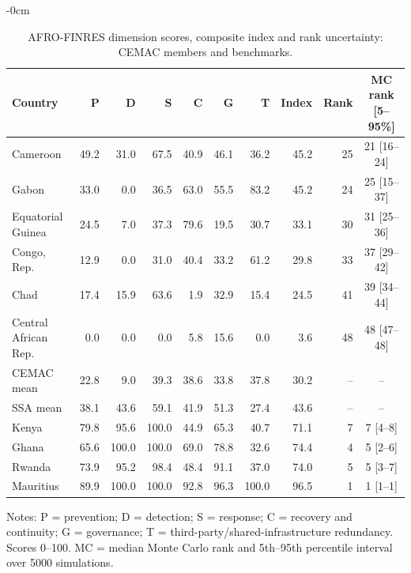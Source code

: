 \documentclass[fintech,article,submit,pdftex,moreauthors]{Definitions/mdpi}
\begin{document}
\begin{table}[H]
\begin{adjustwidth}{-\extralength}{0cm}
\centering
\caption{AFRO-FINRES dimension scores, composite index and rank uncertainty: CEMAC members and benchmarks.}
\label{tab:cemac}
\small
\begin{threeparttable}
\begin{tabular}{l rrrrrr r r c}
\toprule
Country & P & D & S & C & G & T & Index & Rank & MC rank [5--95\%] \\
\midrule
Cameroon & 49.2 & 31.0 & 67.5 & 40.9 & 46.1 & 36.2 & 45.2 & 25 & 21 [16--24] \\
Gabon & 33.0 & 0.0 & 36.5 & 63.0 & 55.5 & 83.2 & 45.2 & 24 & 25 [15--37] \\
Equatorial Guinea & 24.5 & 7.0 & 37.3 & 79.6 & 19.5 & 30.7 & 33.1 & 30 & 31 [25--36] \\
Congo, Rep. & 12.9 & 0.0 & 31.0 & 40.4 & 33.2 & 61.2 & 29.8 & 33 & 37 [29--42] \\
Chad & 17.4 & 15.9 & 63.6 & 1.9 & 32.9 & 15.4 & 24.5 & 41 & 39 [34--44] \\
Central African Rep. & 0.0 & 0.0 & 0.0 & 5.8 & 15.6 & 0.0 & 3.6 & 48 & 48 [47--48] \\
\midrule
CEMAC mean & 22.8 & 9.0 & 39.3 & 38.6 & 33.8 & 37.8 & 30.2 & -- & -- \\
SSA mean & 38.1 & 43.6 & 59.1 & 41.9 & 51.3 & 27.4 & 43.6 & -- & -- \\
\midrule
Kenya & 79.8 & 95.6 & 100.0 & 44.9 & 65.3 & 40.7 & 71.1 & 7 & 7 [4--8] \\
Ghana & 65.6 & 100.0 & 100.0 & 69.0 & 78.8 & 32.6 & 74.4 & 4 & 5 [2--6] \\
Rwanda & 73.9 & 95.2 & 98.4 & 48.4 & 91.1 & 37.0 & 74.0 & 5 & 5 [3--7] \\
Mauritius & 89.9 & 100.0 & 100.0 & 92.8 & 96.3 & 100.0 & 96.5 & 1 & 1 [1--1] \\
\bottomrule
\end{tabular}
\begin{tablenotes}\footnotesize
\item Notes: P = prevention; D = detection; S = response; C = recovery and continuity; G = governance; T = third-party/shared-infrastructure redundancy. Scores 0--100. MC = median Monte Carlo rank and 5th--95th percentile interval over 5000 simulations.
\end{tablenotes}
\end{threeparttable}
\end{adjustwidth}
\end{table}
\end{document}
